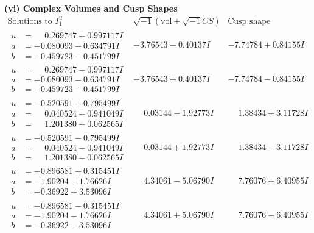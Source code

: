 \documentclass[1p]{elsarticle_modified}
\theoremstyle{definition}
\newcommand{\I}{\sqrt{-1}}
\begin{document}
\newpage\flushleft \textbf{(vi) Complex Volumes and Cusp Shapes}
$$\begin{array}{c|c|c}  
\text{Solutions to }I^u_{1}& \I (\text{vol} + \sqrt{-1}CS) & \text{Cusp shape}\\
 \hline 
\begin{aligned}
u &= \phantom{-}0.269747 + 0.997117 I \\
a &= -0.080093 + 0.634791 I \\
b &= -0.459723 - 0.451799 I\end{aligned}
 & -3.76543 - 0.40137 I & -7.74784 + 0.84155 I \\ \hline\begin{aligned}
u &= \phantom{-}0.269747 - 0.997117 I \\
a &= -0.080093 - 0.634791 I \\
b &= -0.459723 + 0.451799 I\end{aligned}
 & -3.76543 + 0.40137 I & -7.74784 - 0.84155 I \\ \hline\begin{aligned}
u &= -0.520591 + 0.795499 I \\
a &= \phantom{-}0.040524 + 0.941049 I \\
b &= \phantom{-}1.201380 + 0.062565 I\end{aligned}
 & \phantom{-}0.03144 - 1.92773 I & \phantom{-}1.38434 + 3.11728 I \\ \hline\begin{aligned}
u &= -0.520591 - 0.795499 I \\
a &= \phantom{-}0.040524 - 0.941049 I \\
b &= \phantom{-}1.201380 - 0.062565 I\end{aligned}
 & \phantom{-}0.03144 + 1.92773 I & \phantom{-}1.38434 - 3.11728 I \\ \hline\begin{aligned}
u &= -0.896581 + 0.315451 I \\
a &= -1.90204 + 1.76626 I \\
b &= -0.36922 + 3.53096 I\end{aligned}
 & \phantom{-}4.34061 - 5.06790 I & \phantom{-}7.76076 + 6.40955 I \\ \hline\begin{aligned}
u &= -0.896581 - 0.315451 I \\
a &= -1.90204 - 1.76626 I \\
b &= -0.36922 - 3.53096 I\end{aligned}
 & \phantom{-}4.34061 + 5.06790 I & \phantom{-}7.76076 - 6.40955 I \\ \hline\begin{aligned}

\end{aligned}
\end{array}$$
\end{document}
